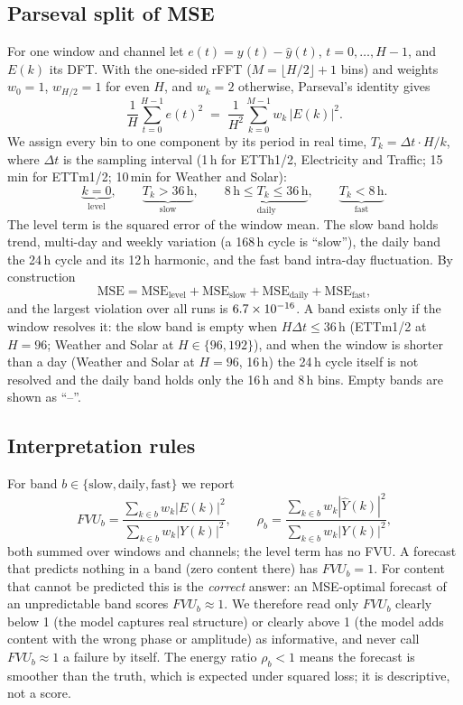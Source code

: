 \documentclass[11pt,a4paper]{article}
\begin{document}
\subsection{Parseval split of MSE}
For one window and channel let $e(t)=y(t)-\hat y(t)$, $t=0,\dots,H-1$, and $E(k)$ its DFT. With the one-sided rFFT ($M=\lfloor H/2\rfloor+1$ bins) and weights $w_0=1$, $w_{H/2}=1$ for even $H$, and $w_k=2$ otherwise, Parseval's identity gives
\begin{equation}
\frac{1}{H}\sum_{t=0}^{H-1} e(t)^2 \;=\; \frac{1}{H^2}\sum_{k=0}^{M-1} w_k\,|E(k)|^2 .
\end{equation}
We assign every bin to one component by its period in real time, $T_k = \Delta t\cdot H/k$, where $\Delta t$ is the sampling interval (1\,h for ETTh1/2, Electricity and Traffic; 15\,min for ETTm1/2; 10\,min for Weather and Solar):
\begin{equation}
\underbrace{k=0}_{\text{level}},\qquad
\underbrace{T_k>36\,\text{h}}_{\text{slow}},\qquad
\underbrace{8\,\text{h}\le T_k\le 36\,\text{h}}_{\text{daily}},\qquad
\underbrace{T_k<8\,\text{h}}_{\text{fast}} .
\end{equation}
The level term is the squared error of the window mean. The slow band holds trend, multi-day and weekly variation (a 168\,h cycle is ``slow''), the daily band the 24\,h cycle and its 12\,h harmonic, and the fast band intra-day fluctuation. By construction
\begin{equation}
\text{MSE} = \text{MSE}_{\text{level}} + \text{MSE}_{\text{slow}} + \text{MSE}_{\text{daily}} + \text{MSE}_{\text{fast}},
\end{equation}
and the largest violation over all \vRunsFinal{} runs is $6.7\times 10^{-16}$. A band exists only if the window resolves it: the slow band is empty when $H\Delta t\le 36$\,h (ETTm1/2 at $H=96$; Weather and Solar at $H\in\{96,192\}$), and when the window is shorter than a day (Weather and Solar at $H=96$, 16\,h) the 24\,h cycle itself is not resolved and the daily band holds only the 16\,h and 8\,h bins. Empty bands are shown as ``--''.

\subsection{Interpretation rules}
For band $b\in\{\text{slow},\text{daily},\text{fast}\}$ we report
\begin{equation}
FVU_b = \frac{\sum_{k\in b} w_k|E(k)|^2}{\sum_{k\in b} w_k|Y(k)|^2},\qquad
\rho_b = \frac{\sum_{k\in b} w_k|\hat Y(k)|^2}{\sum_{k\in b} w_k|Y(k)|^2},
\end{equation}
both summed over windows and channels; the level term has no FVU. A forecast that predicts nothing in a band (zero content there) has $FVU_b=1$. For content that cannot be predicted this is the \emph{correct} answer: an MSE-optimal forecast of an unpredictable band scores $FVU_b\approx 1$. We therefore read only $FVU_b$ clearly below 1 (the model captures real structure) or clearly above 1 (the model adds content with the wrong phase or amplitude) as informative, and never call $FVU_b\approx1$ a failure by itself. The energy ratio $\rho_b<1$ means the forecast is smoother than the truth, which is expected under squared loss; it is descriptive, not a score.
\end{document}
